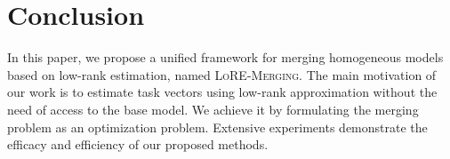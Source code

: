 \section{Conclusion}

In this paper, we propose a unified framework for merging homogeneous models based on low-rank estimation, named \textsc{LoRE-Merging}.
The main motivation of our work is to estimate task vectors using low-rank approximation without the need of access to the base model. We achieve it by formulating the merging problem as an optimization problem.
Extensive experiments demonstrate the efficacy and efficiency of our proposed methods.